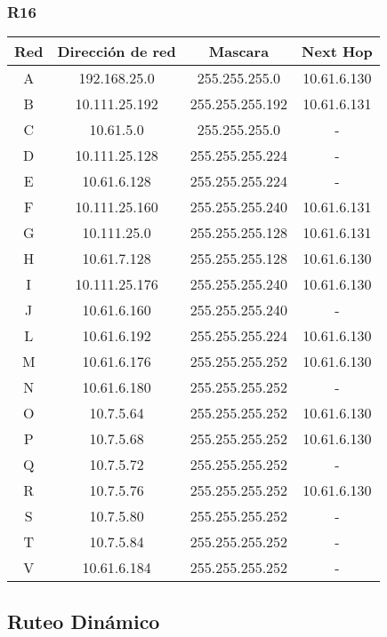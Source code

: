 \subsubsection{R16}
\begin{table}[!htbp]
\centering
  \begin{tabular}{|c|c|c|c|}
  \hline
Red & Dirección de red & Mascara & Next Hop\\ \hline
A & 192.168.25.0 & 255.255.255.0 &10.61.6.130 \\ \hline
B & 10.111.25.192 & 255.255.255.192 & 10.61.6.131 \\ \hline
C & 10.61.5.0 & 255.255.255.0 & -\\ \hline
D & 10.111.25.128 & 255.255.255.224 & -\\ \hline
E & 10.61.6.128 & 255.255.255.224 & -\\ \hline
F & 10.111.25.160 & 255.255.255.240 & 10.61.6.131 \\ \hline
G & 10.111.25.0 & 255.255.255.128 & 10.61.6.131 \\ \hline
H & 10.61.7.128 & 255.255.255.128 & 10.61.6.130 \\ \hline
I & 10.111.25.176 & 255.255.255.240 & 10.61.6.130 \\ \hline
J & 10.61.6.160 & 255.255.255.240 & -\\ \hline
L & 10.61.6.192 & 255.255.255.224 & 10.61.6.130\\ \hline
M & 10.61.6.176 & 255.255.255.252 & 10.61.6.130 \\ \hline
N & 10.61.6.180 & 255.255.255.252 & -\\ \hline
O & 10.7.5.64 & 255.255.255.252 &10.61.6.130 \\ \hline
P & 10.7.5.68 & 255.255.255.252 &10.61.6.130 \\ \hline
Q & 10.7.5.72 & 255.255.255.252 & -\\ \hline
R & 10.7.5.76 & 255.255.255.252 & 10.61.6.130 \\ \hline
S & 10.7.5.80 & 255.255.255.252 & -\\ \hline
T & 10.7.5.84 & 255.255.255.252 & -\\ \hline
V & 10.61.6.184 & 255.255.255.252 & -\\
  \hline
 \end{tabular}
\end{table}

\newpage
\subsection{Ruteo Dinámico}
